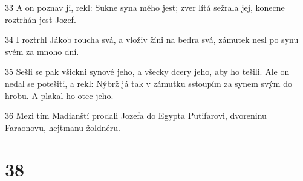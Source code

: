 \par 33 A on poznav ji, rekl: Sukne syna mého jest; zver lítá sežrala jej, konecne roztrhán jest Jozef.
\par 34 I roztrhl Jákob roucha svá, a vloživ žíni na bedra svá, zámutek nesl po synu svém za mnoho dní.
\par 35 Sešli se pak všickni synové jeho, a všecky dcery jeho, aby ho tešili. Ale on nedal se potešiti, a rekl: Nýbrž já tak v zámutku sstoupím za synem svým do hrobu. A plakal ho otec jeho.
\par 36 Mezi tím Madianští prodali Jozefa do Egypta Putifarovi, dvoreninu Faraonovu, hejtmanu žoldnéru.

\chapter{38}

